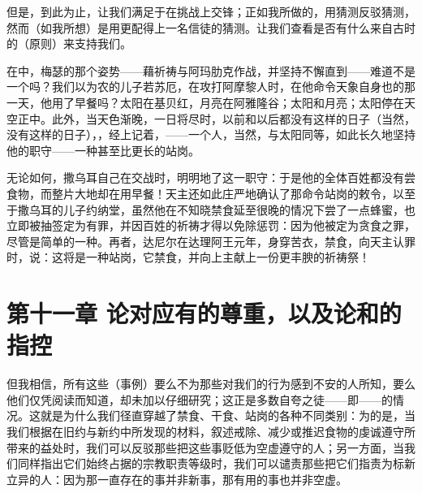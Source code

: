 但是，到此为止，让我们满足于在挑战上交锋；正如我所做的，用猜测反驳猜测，然而（如我所想）是用更配得上一名信徒的猜测。让我们查看是否有什么来自古时的（原则）来支持我们。\par

在中，梅瑟的那个姿势——藉祈祷与阿玛肋克作战，并坚持不懈直到——难道不是一个吗？我们以为农的儿子若苏厄，在攻打阿摩黎人时，在他命令天象自身也的那一天，他用了早餐吗？太阳在基贝红，月亮在阿雅隆谷；太阳和月亮；太阳停在天空正中。此外，当天色渐晚，一日将尽时，以前和以后都没有这样的日子（当然，没有这样的日子），，经上记着，——一个人，当然，与太阳同等，如此长久地坚持他的职守——一种甚至比更长的站岗。\par

无论如何，撒乌耳自己在交战时，明明地了这一职守：于是他的全体百姓都没有尝食物，而整片大地却在用早餐！天主还如此庄严地确认了那命令站岗的敕令，以至于撒乌耳的儿子约纳堂，虽然他在不知晓禁食延至很晚的情况下尝了一点蜂蜜，也立即被抽签定为有罪，并因百姓的祈祷才得以免除惩罚：因为他被定为贪食之罪，尽管是简单的一种。再者，达尼尔在达理阿王元年，身穿苦衣，禁食，向天主认罪时，说：这将是一种站岗，它禁食，并向上主献上一份更丰腴的祈祷祭！\par


\section{第十一章 论对应有的尊重，以及论和的指控}

但我相信，所有这些（事例）要么不为那些对我们的行为感到不安的人所知，要么他们仅凭阅读而知道，却未加以仔细研究；这正是多数自夸之徒——即——的情况。这就是为什么我们径直穿越了禁食、干食、站岗的各种不同类别：为的是，当我们根据在旧约与新约中所发现的材料，叙述戒除、减少或推迟食物的虔诚遵守所带来的益处时，我们可以反驳那些把这些事贬低为空虚遵守的人；另一方面，当我们同样指出它们始终占据的宗教职责等级时，我们可以谴责那些把它们指责为标新立异的人：因为那一直存在的事并非新事，那有用的事也并非空虚。\par


